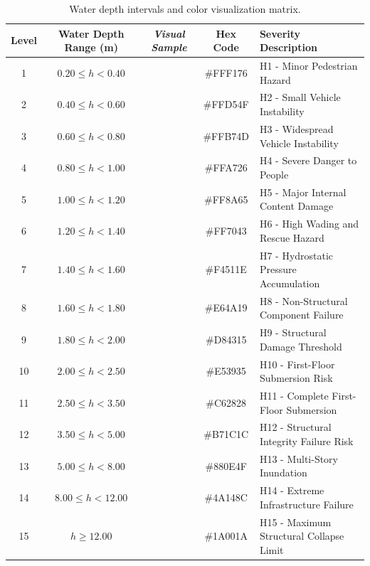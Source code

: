 \begin{table}[h!]
\centering
\caption{Water depth intervals and color visualization matrix.}
\label{tab:hydraulic_scale}
\small
\begin{tabular}{|c|c|c|c|l|}
\hline
\textbf{Level} & \textbf{Water Depth Range (m)} & \textbf{\em Visual Sample} & \textbf{Hex Code} & \textbf{Severity Description} \\ \hline
1  & $0.20 \le h < 0.40$  & \cellcolor{flevelOne}       & \#FFF176 & H1 - Minor Pedestrian Hazard \\ \hline
2  & $0.40 \le h < 0.60$  & \cellcolor{flevelTwo}       & \#FFD54F & H2 - Small Vehicle Instability \\ \hline
3  & $0.60 \le h < 0.80$  & \cellcolor{flevelThree}     & \#FFB74D & H3 - Widespread Vehicle Instability \\ \hline
4  & $0.80 \le h < 1.00$  & \cellcolor{flevelFour}      & \#FFA726 & H4 - Severe Danger to People \\ \hline
5  & $1.00 \le h < 1.20$  & \cellcolor{flevelFive}      & \#FF8A65 & H5 - Major Internal Content Damage \\ \hline
6  & $1.20 \le h < 1.40$  & \cellcolor{flevelSix}       & \#FF7043 & H6 - High Wading and Rescue Hazard \\ \hline
7  & $1.40 \le h < 1.60$  & \cellcolor{flevelSeven}     & \#F4511E & H7 - Hydrostatic Pressure Accumulation \\ \hline
8  & $1.60 \le h < 1.80$  & \cellcolor{flevelEight}     & \#E64A19 & H8 - Non-Structural Component Failure \\ \hline
9  & $1.80 \le h < 2.00$  & \cellcolor{flevelNine}      & \#D84315 & H9 - Structural Damage Threshold \\ \hline
10 & $2.00 \le h < 2.50$  & \cellcolor{flevelTen}       & \#E53935 & H10 - First-Floor Submersion Risk \\ \hline
11 & $2.50 \le h < 3.50$  & \cellcolor{flevelEleven}    & \#C62828 & H11 - Complete First-Floor Submersion \\ \hline
12 & $3.50 \le h < 5.00$  & \cellcolor{flevelTwelve}    & \#B71C1C & H12 - Structural Integrity Failure Risk \\ \hline
13 & $5.00 \le h < 8.00$  & \cellcolor{flevelThirteen}  & \#880E4F & H13 - Multi-Story Inundation \\ \hline
14 & $8.00 \le h < 12.00$ & \cellcolor{flevelFourteen}  & \#4A148C & H14 - Extreme Infrastructure Failure \\ \hline
15 & $h \ge 12.00$        & \cellcolor{flevelFifteen}\color{white} & \#1A001A & H15 - Maximum Structural Collapse Limit \\ \hline
\end{tabular}
\end{table}
